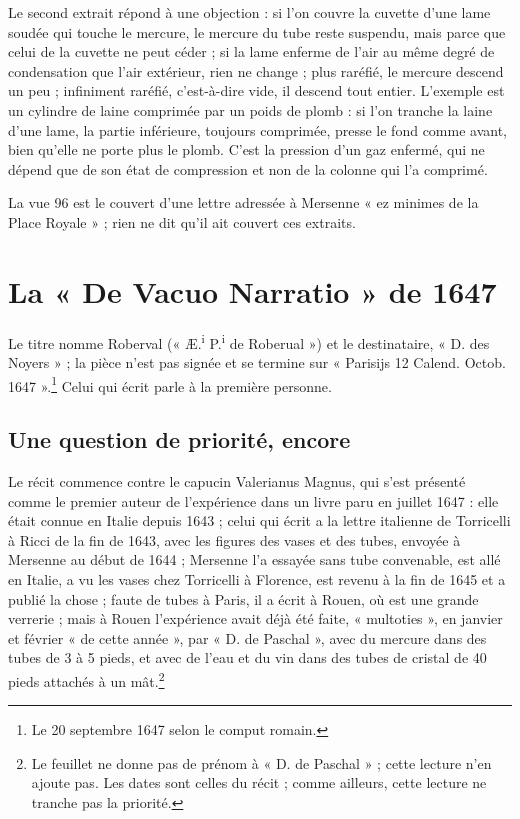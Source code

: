 \documentclass[11pt,a4paper]{article}
\begin{document}
Le second extrait répond à une objection : si l'on couvre la cuvette d'une lame
soudée qui touche le mercure, le mercure du tube reste suspendu, mais parce que
celui de la cuvette ne peut céder ; si la lame enferme de l'air au même degré de
condensation que l'air extérieur, rien ne change ; plus raréfié, le mercure
descend un peu ; infiniment raréfié, c'est-à-dire vide, il descend tout entier.
L'exemple est un cylindre de laine comprimée par un poids de plomb : si l'on
tranche la laine d'une lame, la partie inférieure, toujours comprimée, presse le
fond comme avant, bien qu'elle ne porte plus le plomb. C'est la pression d'un gaz
enfermé, qui ne dépend que de son état de compression et non de la colonne qui
l'a comprimé.

La vue 96 est le couvert d'une lettre adressée à Mersenne « ez minimes de la Place
Royale » ; rien ne dit qu'il ait couvert ces extraits.

\section*{La « De Vacuo Narratio » de 1647}

Le titre nomme Roberval (« Æ.\textsuperscript{i} P.\textsuperscript{i} de
Roberual ») et le destinataire, « D. des Noyers » ; la pièce n'est pas signée et
se termine sur « Parisijs 12 Calend. Octob. 1647 ».\footnote{Le 20 septembre 1647
selon le comput romain.} Celui qui écrit parle à la première personne.

\subsection*{Une question de priorité, encore}

Le récit commence contre le capucin Valerianus Magnus, qui s'est présenté comme
le premier auteur de l'expérience dans un livre paru en juillet 1647 : elle était
connue en Italie depuis 1643 ; celui qui écrit a la lettre italienne de
Torricelli à Ricci de la fin de 1643, avec les figures des vases et des tubes,
envoyée à Mersenne au début de 1644 ; Mersenne l'a essayée sans tube convenable,
est allé en Italie, a vu les vases chez Torricelli à Florence, est revenu à la fin
de 1645 et a publié la chose ; faute de tubes à Paris, il a écrit à Rouen, où est
une grande verrerie ; mais à Rouen l'expérience avait déjà été faite,
« multoties », en janvier et février « de cette année », par « D. de Paschal »,
avec du mercure dans des tubes de 3 à 5 pieds, et avec de l'eau et du vin dans
des tubes de cristal de 40 pieds attachés à un mât.\footnote{Le feuillet ne donne
pas de prénom à « D. de Paschal » ; cette lecture n'en ajoute pas. Les dates sont
celles du récit ; comme ailleurs, cette lecture ne tranche pas la priorité.}
\end{document}
